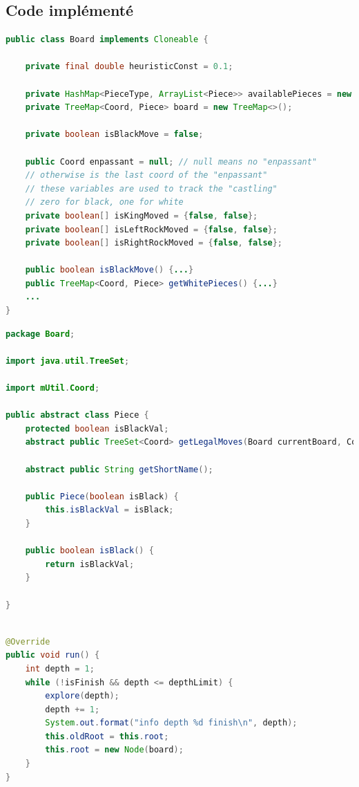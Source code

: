 \documentclass{article}
\begin{document}
\clearpage
\begin{appendices}
\section{Code implémenté}

\begin{lstlisting}[language=java, caption={Une partie des fonctions réalisées dans la classe \texttt{Board}.}, label={lst:board}]
public class Board implements Cloneable {

    private final double heuristicConst = 0.1;

    private HashMap<PieceType, ArrayList<Piece>> availablePieces = new HashMap<>();
    private TreeMap<Coord, Piece> board = new TreeMap<>();

    private boolean isBlackMove = false;
    
    public Coord enpassant = null; // null means no "enpassant"
    // otherwise is the last coord of the "enpassant"
    // these variables are used to track the "castling"
    // zero for black, one for white
    private boolean[] isKingMoved = {false, false};
    private boolean[] isLeftRockMoved = {false, false};
    private boolean[] isRightRockMoved = {false, false};

    public boolean isBlackMove() {...}
    public TreeMap<Coord, Piece> getWhitePieces() {...}
    ...
}
\end{lstlisting}

\begin{lstlisting}[language=java, caption={La classe abstracte \texttt{Piece}.}, label={lst:piece}]
package Board;

import java.util.TreeSet;

import mUtil.Coord;

public abstract class Piece {
    protected boolean isBlackVal;
    abstract public TreeSet<Coord> getLegalMoves(Board currentBoard, Coord currentCoord);

    abstract public String getShortName();
        
    public Piece(boolean isBlack) {
        this.isBlackVal = isBlack;
    }
    
    public boolean isBlack() {
        return isBlackVal;
    }

}
\end{lstlisting}

\begin{lstlisting}[language=java, caption={La recherche récursive, réalisée par un thread séparant.}, label={lst:recherche}]

@Override
public void run() {
    int depth = 1;
    while (!isFinish && depth <= depthLimit) {
        explore(depth);
        depth += 1;
        System.out.format("info depth %d finish\n", depth);
        this.oldRoot = this.root;
        this.root = new Node(board);
    }
}
    
\end{lstlisting}

\end{appendices}
\end{document}
